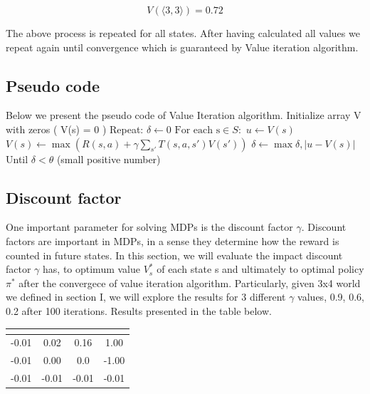 \documentclass[10pt,a4paper,twocolumn]{article}
\newcommand\tab[1][0.25cm]{\hspace*{#1}}
\begin{document}
	\begin{equation}
	 V(\big \langle 3,3 \big \rangle) = 0.72
	\end{equation}


	The above process is repeated for all states. After having calculated all values we repeat again until convergence which is guaranteed by Value iteration algorithm.
	\subsection{Pseudo code}
	Below we present the pseudo code of Value Iteration algorithm.
	\newline
	\newline
	Initialize array V with zeros ( V(s) = 0 )
	\newline
	Repeat:
	\newline
	\tab $\delta \leftarrow 0$
	\newline
	\tab  $\text{For each s} \in S:$
	\newline
	\tab  \tab  $u \leftarrow V(s)$
	\newline
	\tab  \tab  $V(s) \leftarrow \max{ ( R(s,a) + \gamma \sum_{s'}T(s,a,s')V(s') )}$
	\newline
	\tab  \tab  $\delta \leftarrow \max{\delta, | u - V(s)|}$
	\newline
	Until $\delta < \theta$ (small positive number)
	
	
	\subsection{Discount factor}
	 One  important parameter for solving  MDPs is the discount factor $\gamma$. Discount factors are important in MDPs, in a sense they determine how the reward is counted in future states.
	 In this section, we will evaluate the impact discount factor $\gamma$ has, to optimum value $V_{s}^{*}$ of each state s and ultimately to optimal policy $\pi^{*} $ after the convergece of value iteration algorithm. Particularly, given 3x4 world we defined in section I, we will explore the results for 3 different $\gamma$ values, 0.9, 0.6, 0.2 after 100 iterations. Results presented in the table below.
	 
	 	\begin{center}
	 	\begin{tabular}{ c c c c}
	 		\hline
	 		\multicolumn{4}{|c|}{  \text{$\gamma = 0.2$} } \\
	 		\hline
	 		-0.01  & 0.02  & 0.16 & 1.00 \\ 
	 		-0.01  & 0.00  & 0.0  & -1.00 \\  
	 		-0.01 & -0.01 &  -0.01 & -0.01
	 	\end{tabular}
	 \end{center}
	
\end{document}
